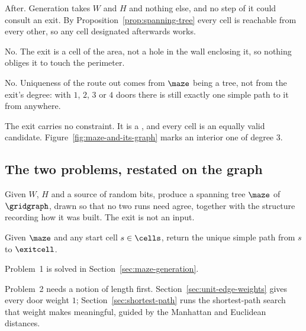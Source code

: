 \begin{description}[leftmargin=*,style=nextline,itemsep=5pt]
  \item[Chosen before or after generation?] After. Generation takes $W$ and $H$
    and nothing else, and no step of it could consult an exit. By
    Proposition~\ref{prop:spanning-tree} every cell is reachable from every
    other, so any cell designated afterwards works.
  \item[On the boundary?] No. The exit is a cell of the area, not a hole in the
    wall enclosing it, so nothing obliges it to touch the perimeter.
  \item[Exactly one door?] No. Uniqueness of the route out comes from $\maze$
    being a tree, not from the exit's degree: with $1$, $2$, $3$ or $4$ doors
    there is still exactly one simple path to it from anywhere.
\end{description}

\begin{keypoint}
The exit carries no constraint. It is a , and every cell is an equally valid candidate.
Figure~\ref{fig:maze-and-its-graph} marks an interior one of degree $3$.
\end{keypoint}

\subsection{The two problems, restated on the graph}

\begin{description}[leftmargin=*,style=nextline,itemsep=5pt]
  \item[Problem 1 --- Generation.] Given $W$, $H$ and a source of random bits,
    produce a spanning tree $\maze$ of $\gridgraph$, drawn so that no two runs
    need agree, together with the structure recording how it was built. The
    exit is not an input.
  \item[Problem 2 --- Escape.] Given $\maze$ and any start cell $s\in\cells$,
    return the unique simple path from $s$ to $\exitcell$.
\end{description}

Problem~1 is solved in Section~\ref{sec:maze-generation}.

Problem~2 needs a notion of length first. Section~\ref{sec:unit-edge-weights}
gives every door weight $1$; Section~\ref{sec:shortest-path} runs the
shortest-path search that weight makes meaningful, guided by the Manhattan and
Euclidean distances.

